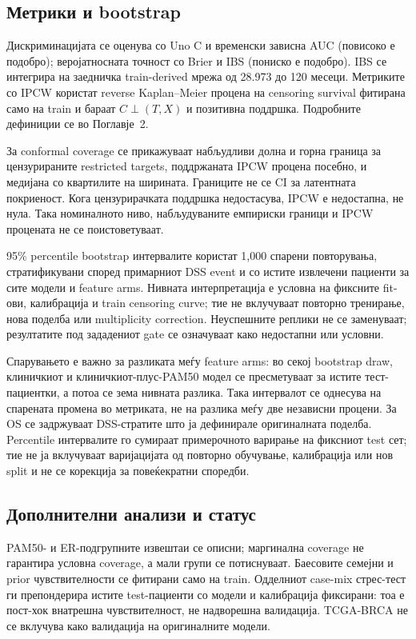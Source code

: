 \documentclass[12pt]{article}
\begin{document}
\subsection{Метрики и bootstrap}

Дискриминацијата се оценува со Uno C и временски зависна AUC (повисоко е подобро);
веројатносната точност со Brier и IBS (пониско е подобро). IBS се интегрира на
заедничка train-derived мрежа од 28.973 до 120 месеци. Метриките со IPCW користат
reverse Kaplan--Meier процена на censoring survival фитирана само на train и
бараат $C\perp(T,X)$ и позитивна поддршка. Подробните дефиниции се во Поглавје~2.

За conformal coverage се прикажуваат набљудливи долна и горна граница за
цензурираните restricted targets, поддржаната IPCW процена посебно, и медијана
со квартилите на ширината. Границите не се CI за латентната покриеност. Кога
цензурирачката поддршка недостасува, IPCW е недостапна, не нула. Така номиналното
ниво, набљудуваните емпириски граници и IPCW процената не се поистоветуваат.

95\% percentile bootstrap интервалите користат 1,000 спарени повторувања,
стратификувани според примарниот DSS event и со истите извлечени пациенти за
сите модели и feature arms. Нивната интерпретација е условна на фиксните fit-ови,
калибрација и train censoring curve; тие не вклучуваат повторно тренирање, нова
поделба или multiplicity correction. Неуспешните реплики не се заменуваат;
резултатите под зададениот gate се означуваат како недостапни или условни.

Спарувањето е важно за разликата меѓу feature arms: во секој bootstrap draw,
клиничкиот и клиничкиот-плус-PAM50 модел се пресметуваат за истите тест-пациентки,
а потоа се зема нивната разлика. Така интервалот се однесува на спарената
промена во метриката, не на разлика меѓу две независни процени. За OS се
задржуваат DSS-стратите што ја дефинирале оригиналната поделба. Percentile
интервалите го сумираат примерочното варирање на фиксниот test сет; тие не ја
вклучуваат варијацијата од повторно обучување, калибрација или нов split и не се
корекција за повеќекратни споредби.

\subsection{Дополнителни анализи и статус}

PAM50- и ER-подгрупните извештаи се описни; маргинална coverage не гарантира
условна coverage, а мали групи се потиснуваат. Баесовите семејни и prior
чувствителности се фитирани само на train. Одделниот case-mix стрес-тест ги
препондерира истите test-пациенти со модели и калибрација фиксирани: тоа е
пост-хок внатрешна чувствителност, не надворешна валидација. TCGA-BRCA не се
вклучува како валидација на оригиналните модели.
\end{document}
